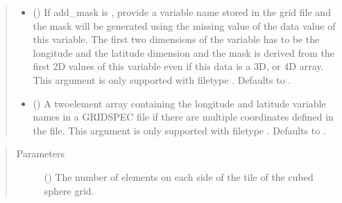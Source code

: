 \documentclass[letterpaper,10pt,english]{sphinxmanual}
\begin{document}
\begin{fulllineitems}
\begin{quote}
\begin{description}
\begin{itemize}
\item {} 
 () \textendash{} If add\_mask is , provide a variable name stored
in the grid file and the mask will be generated using the missing value
of the data value of this variable.  The first two dimensions of the
variable has to be the longitude and the latitude dimension and the
mask is derived from the first 2D values of this variable even if this
data is a 3D, or 4D array. This argument is only supported with
filetype {\hyperref[\detokenize{FileFormat:ESMF.api.constants.FileFormat.GRIDSPEC}]{}}.
Defaults to .

\item {} 
 () \textendash{} A two\sphinxhyphen{}element array containing the longitude and
latitude variable names in a GRIDSPEC file if there are multiple
coordinates defined in the file. This argument is only supported with
filetype {\hyperref[\detokenize{FileFormat:ESMF.api.constants.FileFormat.GRIDSPEC}]{}}.
Defaults to .

\end{itemize}

\end{description}\end{quote}


\begin{quote}\begin{description}
\item[{Parameters}] \leavevmode
{} () \textendash{} The number of elements on each side of the tile of the
cubed sphere grid.

\end{description}\end{quote}


\end{fulllineitems}
\end{document}

